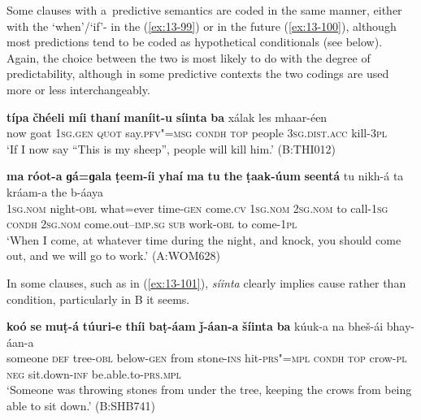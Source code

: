 Some clauses with a~predictive semantics are coded in the same manner, either with the `when'/`if'- in the  (\ref{ex:13-99}) or in the future (\ref{ex:13-100}), although most predictions tend to be coded as hypothetical conditionals (see below). Again, the choice between the two is most likely to do with the degree of predictability, although in some predictive contexts the two codings are used more or less interchangeably.

\begin{exe}
\ex
\label{ex:13-99}
\gll \textbf{típa} \textbf{čhéeli} \textbf{míi} \textbf{thaní} \textbf{maníit-u} \textbf{síinta} \textbf{ba}  xálak les mhaar-éen\\
now goat \textsc{1sg.gen} \textsc{quot} say.\textsc{pfv"=msg} \textsc{condh} \textsc{top} people \textsc{3sg.dist.acc} kill-\textsc{3pl}\\
\glt `If I now say ``This is my sheep'', people will kill him.' (B:THI012)

\ex
\label{ex:13-100}
\gll \textbf{ma} \textbf{róot-a} \textbf{ɡá=ɡala} \textbf{ṭeem-íi} \textbf{yhaí} \textbf{ma} \textbf{tu} \textbf{the} \textbf{ṭaak-úum} \textbf{seentá} tu nikh-á ta kráam-a the b-áaya\\
\textsc{1sg.nom} night-\textsc{obl} what=ever time-\textsc{gen} come.\textsc{cv} \textsc{1sg.nom} \textsc{2sg.nom} to call-\textsc{1sg} \textsc{condh} \textsc{2sg.nom} come.out--\textsc{imp.sg} \textsc{sub} work-\textsc{obl} to come-\textsc{1pl}\\
\glt `When I come, at whatever time during the night, and knock, you should come out, and we will go to work.' (A:WOM628) 
\end{exe}

In some clauses, such as in (\ref{ex:13-101}), \textit{síinta} clearly implies cause rather than condition, particularly in B it seems.

\begin{exe}
\ex
\label{ex:13-101}
\gll \textbf{koó} \textbf{se} \textbf{muṭ-á} \textbf{túuri-e} \textbf{thíi} \textbf{baṭ-áam} \textbf{ǰ-áan-a} \textbf{šíinta} \textbf{ba} kúuk-a
na bheš-ái  bhay-áan-a \\
someone \textsc{def} tree-\textsc{obl} below-\textsc{gen} from stone-\textsc{ins}  hit-\textsc{prs"=mpl} \textsc{condh} \textsc{top} crow-\textsc{pl} \textsc{neg} sit.down-\textsc{inf} be.able.to-\textsc{prs.mpl} \\
\glt `Someone was throwing stones from under the tree, keeping the crows from being able to sit down.' (B:SHB741) 
\end{exe}

